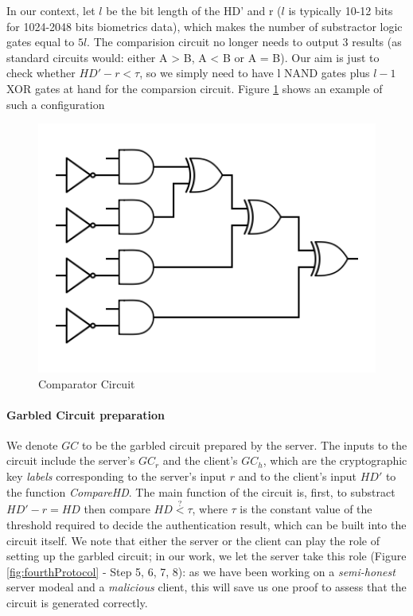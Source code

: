 In our context, let \(l\) be the bit length of the HD' and r (\(l\) is
typically 10-12 bits for 1024-2048 bits biometrics data), which makes the number of substractor logic gates equal to
\(5l\). The comparision circuit no longer needs 
to output 3 results (as standard circuits would: either A > B, A < B
or A = B). Our aim is just to check whether \(HD' - r < \tau\), so we simply need to
have l NAND gates plus \(l-1\) XOR gates at hand for the comparsion circuit. Figure \ref{fig:comparisionCircuit} shows an example of such a configuration
\begin{figure}[htbp!] 
  \centering    
  \includegraphics[width=1.0\textwidth]{Chapter7/Figs/Raster/comparisionCircuit}
  \caption{Comparator Circuit}
  \label{fig:comparisionCircuit}
\end{figure}

\paragraph{Garbled Circuit preparation}
We denote \(GC\) to be the garbled circuit prepared by the server. The inputs to
the circuit include the server's \(GC_{r}\) and the client's \(GC_{h}\), which
are the cryptographic key \textit{labels} corresponding to the server's input
\(r\) and to the client's input \(HD'\) to the function \textit{CompareHD}. The main
function of the circuit is, first, to substract \(HD' - r = HD\) then compare
\(HD \stackrel{?}{<} \tau\), where \(\tau\) is the constant value of the
threshold required to decide the authentication result, which can be built into the
circuit itself. We note that either the server or the client can play the role of
setting up the garbled circuit; in our work, we let the server take this role
(Figure \ref{fig:fourthProtocol} - Step 5, 6, 7, 8): as we have
been working on a \textit{semi-honest} server modeal and a \textit{malicious }
client, this will save us one proof to assess that the circuit is generated
correctly.


